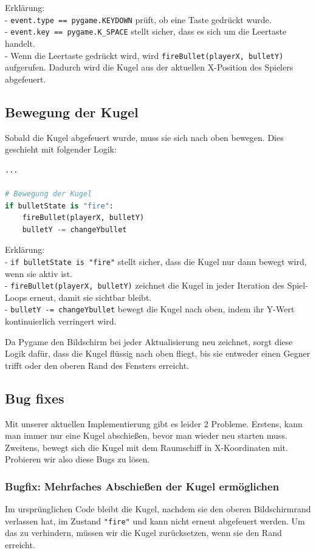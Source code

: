 \documentclass{article}
\begin{document}
Erklärung:\\
- \texttt{event.type == pygame.KEYDOWN} prüft, ob eine Taste gedrückt wurde.\\
- \texttt{event.key == pygame.K\_SPACE} stellt sicher, dass es sich um die Leertaste handelt.\\
- Wenn die Leertaste gedrückt wird, wird \texttt{fireBullet(playerX, bulletY)} aufgerufen. Dadurch wird die Kugel aus der aktuellen X-Position des Spielers abgefeuert.\\

\subsection{Bewegung der Kugel}
Sobald die Kugel abgefeuert wurde, muss sie sich nach oben bewegen. Dies geschieht mit folgender Logik:

\begin{lstlisting}[style=pythonstyle, language=Python]
...

# Bewegung der Kugel
if bulletState is "fire":
    fireBullet(playerX, bulletY)
    bulletY -= changeYbullet
\end{lstlisting}

Erklärung:\\
- \texttt{if bulletState is "fire"} stellt sicher, dass die Kugel nur dann bewegt wird, wenn sie aktiv ist.\\
- \texttt{fireBullet(playerX, bulletY)} zeichnet die Kugel in jeder Iteration des Spiel-Loops erneut, damit sie sichtbar bleibt.\\
- \texttt{bulletY -= changeYbullet} bewegt die Kugel nach oben, indem ihr Y-Wert kontinuierlich verringert wird.

Da Pygame den Bildschirm bei jeder Aktualisierung neu zeichnet, sorgt diese Logik dafür, dass die Kugel flüssig nach oben fliegt, bis sie entweder einen Gegner trifft oder den oberen Rand des Fensters erreicht.

\subsection{Bug fixes}
Mit unserer aktuellen Implementierung gibt es leider 2 Probleme. Erstens, kann man immer nur eine Kugel abschießen, bevor man wieder neu starten muss. Zweitens, bewegt sich die Kugel mit dem Raumschiff in X-Koordinaten mit. Probieren wir also diese Bugs zu lösen.

\subsubsection{Bugfix: Mehrfaches Abschießen der Kugel ermöglichen}
Im ursprünglichen Code bleibt die Kugel, nachdem sie den oberen Bildschirmrand verlassen hat, im Zustand \texttt{"fire"} und kann nicht erneut abgefeuert werden. Um das zu verhindern, müssen wir die Kugel zurücksetzen, wenn sie den Rand erreicht.
\end{document}
